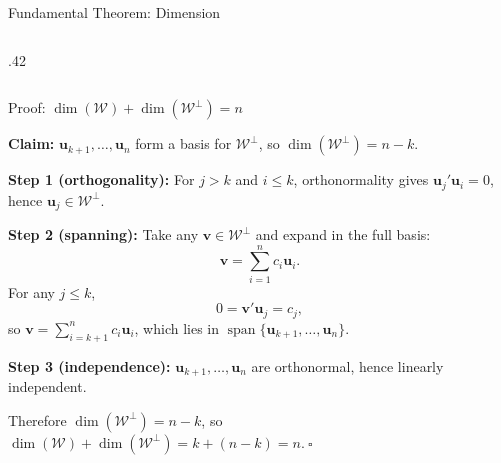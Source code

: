 \documentclass[aspectratio=169, handout, t]{beamer}
\DeclareMathOperator{\spn}{span}
\numberwithin{equation}{section}
\begin{document}
\begin{frame}{Fundamental Theorem: Dimension}
\begin{columns}
\begin{column}{.42\textwidth}
\begin{center}
\end{center}
\end{column}
\end{columns}

\end{frame}


\begin{frame}{Proof: $\dim(\mathcal{W})+\dim(\mathcal{W}^{\perp})=n$}

\textbf{Claim:} $\bm{u}_{k+1},\ldots,\bm{u}_n$ form a basis for $\mathcal{W}^{\perp}$, so $\dim(\mathcal{W}^{\perp})=n-k$.\pause

\vspace{0.2cm}

\textbf{Step 1 (orthogonality):}
For $j>k$ and $i\le k$, orthonormality gives $\bm{u}_j'\bm{u}_i=0$, hence $\bm{u}_j\in\mathcal{W}^{\perp}$.\pause

\vspace{0.2cm}

\textbf{Step 2 (spanning):}
Take any $\bm{v}\in\mathcal{W}^{\perp}$ and expand in the full basis:
\[
\bm{v}=\sum_{i=1}^n c_i\bm{u}_i.
\]\pause
For any $j\le k$,
\[
0=\bm{v}'\bm{u}_j=c_j,
\]
so $\bm{v}=\sum_{i=k+1}^n c_i\bm{u}_i$, which lies in $\spn\{\bm{u}_{k+1},\ldots,\bm{u}_n\}$.\pause

\vspace{0.2cm}

\textbf{Step 3 (independence):}
$\bm{u}_{k+1},\ldots,\bm{u}_n$ are orthonormal, hence linearly independent.\pause

\vspace{0.2cm}

Therefore $\dim(\mathcal{W}^{\perp})=n-k$, so $\dim(\mathcal{W})+\dim(\mathcal{W}^{\perp})=k+(n-k)=n.\ \square$

\end{frame}
\end{document}
